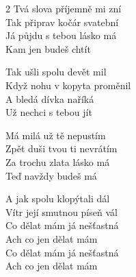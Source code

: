 \begin{multicols}{2}
\ve
Tvá slova příjemně mi zní\\
Tak připrav kočár svatební\\
Já půjdu s tebou lásko má\\
Kam jen budeš chtít

\ve
Tak ušli spolu devět mil\\
Když nohu v kopyta proměnil\\
A bledá dívka naříká\\
Už nechci s tebou jít

\ve
Má milá už tě nepustím\\
Zpět duši tvou ti nevrátím\\
Za trochu zlata lásko má\\
Teď navždy budeš má

\ve
A jak spolu klopýtali dál\\
Vítr její smutnou píseň vál\\
Co dělat mám já nešťastná\\
Ach co jen dělat mám\\
Co dělat mám já nešťastná\\
Ach co jen dělat mám

\end{multicols}
\esong